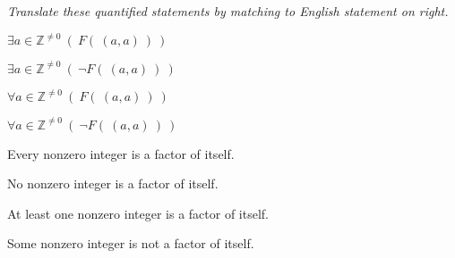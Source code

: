 
{\it Translate these quantified statements by matching to English statement on right.}

\begin{multicols}{2}
$\exists a\in \mathbb{Z}^{\neq 0} ~(~F(~(a,a)~)~)$

$\exists a\in \mathbb{Z}^{\neq 0} ~(~\lnot F(~(a,a)~)~)$

$\forall a\in \mathbb{Z}^{\neq 0} ~(~F(~(a,a)~)~)$

$\forall a\in \mathbb{Z}^{\neq 0} ~(~\lnot F(~(a,a)~)~)$


Every nonzero integer is a factor of itself.

No nonzero integer is a factor of itself.

At least one nonzero integer is a factor of itself.

Some nonzero integer is not a factor of itself.
\end{multicols}